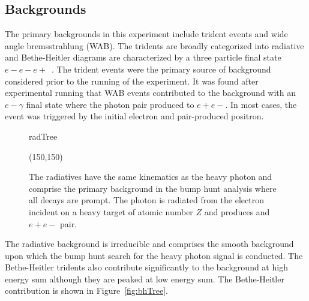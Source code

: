 \subsection{Backgrounds}

The primary backgrounds in this experiment include trident events and wide angle bremsstrahlung (WAB). The tridents are broadly categorized into radiative and Bethe-Heitler diagrams are characterized by a three particle final state $e-e-e+$~\cite{bjorken_new_2009}. The trident events were the primary source of background considered prior to the running of the experiment. It was found after experimental running that WAB events contributed to the background with an $e-\gamma$ final state where the photon pair produced to $e+e-$. In most cases, the event was triggered by the initial electron and pair-produced positron. 

\begin{figure}[H]
    \begin{center}
	\begin{fmffile}{radTree}
	\begin{fmfgraph*}(150,150)
	\fmfstraight
		\fmffreeze
		\fmffreeze	
	\end{fmfgraph*}
	\end{fmffile}
  	\end{center}
    	\caption[Radiative background]{The radiatives have the same kinematics as the heavy photon and comprise the primary background in the bump hunt analysis where all decays are prompt. The photon is radiated from the electron incident on a heavy target of atomic number $Z$ and produces and $e+e-$ pair.}
   	 \label{fig:radTree}	
\end{figure}

The radiative background is irreducible and comprises the smooth background upon which the bump hunt search for the heavy photon signal is conducted. The Bethe-Heitler tridents also contribute significantly to the background at high energy sum although they are peaked at low energy sum. The Bethe-Heitler contribution is shown in Figure~\ref{fig:bhTree}.

